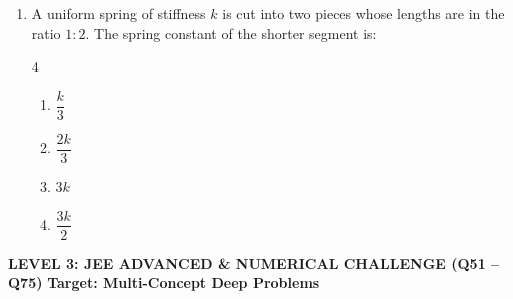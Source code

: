 \documentclass[11pt,a4paper]{article}
\begin{document}
\begin{enumerate}[label=\textbf{\arabic*.},leftmargin=18pt,itemsep=8pt,resume]
  \item A uniform spring of stiffness $k$ is cut into two pieces whose lengths are in the ratio $1 : 2$. The spring constant of the shorter segment is:
  \begin{multicols}{4}
    \begin{enumerate}[label=(\Alph*)]
      \item $\dfrac{k}{3}$
      \item $\dfrac{2k}{3}$
      \item $3k$
      \item $\dfrac{3k}{2}$
    \end{enumerate}
  \end{multicols}

\end{enumerate}
\newpage


\begin{tcolorbox}[l3banner]
  {\large \textbf{\textsf{LEVEL 3: JEE ADVANCED \& NUMERICAL CHALLENGE (Q51 -- Q75)}}} \hfill {\small \textbf{Target: Multi-Concept Deep Problems}}
\end{tcolorbox}
\vspace{4pt}

\noindent{\textbf{\textsf{\textcolor{l3Crimson}{Section A: Advanced Conceptual Multi-Choice Questions (Q51 -- Q69)}}}}
\vspace{2pt}
\end{document}
